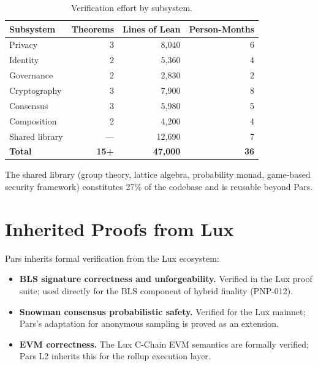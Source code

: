 \documentclass[11pt,a4paper]{article}
\begin{document}
\begin{table}[h]
\centering
\caption{Verification effort by subsystem.}
\label{tab:effort}
\begin{tabular}{@{}lrrr@{}}
\toprule
\textbf{Subsystem} & \textbf{Theorems} & \textbf{Lines of Lean} & \textbf{Person-Months} \\
\midrule
Privacy       & 3 & 8{,}040  & 6 \\
Identity      & 2 & 5{,}360  & 4 \\
Governance    & 2 & 2{,}830  & 2 \\
Cryptography  & 3 & 7{,}900  & 8 \\
Consensus     & 3 & 5{,}980  & 5 \\
Composition   & 2 & 4{,}200  & 4 \\
Shared library & --- & 12{,}690 & 7 \\
\midrule
\textbf{Total} & \textbf{15+} & \textbf{47{,}000} & \textbf{36} \\
\bottomrule
\end{tabular}
\end{table}

The shared library (group theory, lattice algebra, probability monad,
game-based security framework) constitutes 27\% of the codebase and is
reusable beyond Pars.

\section{Inherited Proofs from Lux}
\label{sec:inherited}

Pars inherits formal verification from the Lux ecosystem:

\begin{itemize}
    \item \textbf{BLS signature correctness and unforgeability.}  Verified
    in the Lux proof suite; used directly for the BLS component of
    hybrid finality (PNP-012).
    \item \textbf{Snowman consensus probabilistic safety.}  Verified for
    the Lux mainnet; Pars's adaptation for anonymous sampling is proved
    as an extension.
    \item \textbf{EVM correctness.}  The Lux C-Chain EVM semantics are
    formally verified; Pars L2 inherits this for the rollup execution
    layer.
\end{itemize}

\end{document}
